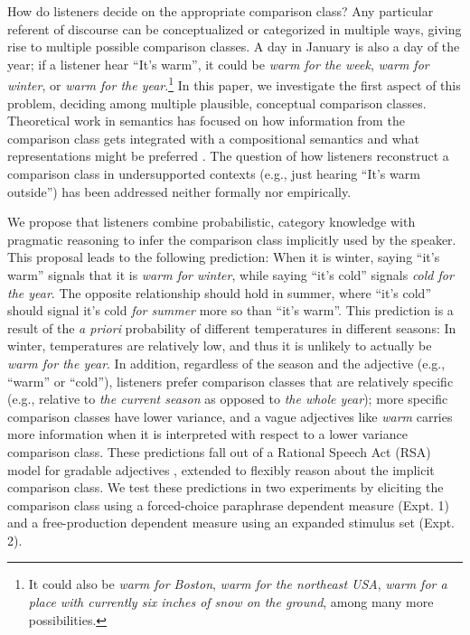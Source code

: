 \documentclass[doc]{apa6}
\begin{document}
How do listeners decide on the appropriate comparison class? Any
particular referent of discourse can be conceptualized or categorized in
multiple ways, giving rise to multiple possible comparison classes. A day in
January is also a day of the year; if a listener hear ``It's
warm'', it could be \emph{warm for the week}, \emph{warm for winter}, or
\emph{warm for the year}.\footnote{It could also be \emph{warm for
  Boston}, \emph{warm for the northeast USA}, \emph{warm for a place
  with currently six inches of snow on the ground}, among many more
  possibilities. } In this paper, we investigate the first aspect of
this problem, deciding among multiple plausible, conceptual comparison
classes. Theoretical work in semantics has focused on how information
from the comparison class gets integrated with a compositional semantics
and what representations might be preferred \cite{Bale2011, Solt2009}.
The question of how listeners reconstruct a comparison class in
undersupported contexts (e.g., just hearing ``It's warm outside'')
has been addressed neither formally nor empirically.

We propose that listeners combine probabilistic, category knowledge with
pragmatic reasoning to infer the comparison class implicitly used by the
speaker. This proposal leads to the following prediction: When it is
winter, saying ``it's warm'' signals that it is \emph{warm for
winter}, while saying ``it's cold'' signals \emph{cold for the
year}. The opposite relationship should hold in summer, where
``it's cold'' should signal it's cold \emph{for summer} more so
than ``it's warm''. This prediction is a result of the \emph{a
priori} probability of different temperatures in different seasons: In
winter, temperatures are relatively low, and thus it is unlikely to
actually be \emph{warm for the year}. In addition, regardless of the
season and the adjective (e.g., ``warm'' or ``cold''),
listeners prefer comparison classes that are relatively specific (e.g.,
relative to \emph{the current season} as opposed to \emph{the whole
year}); more specific comparison classes have lower variance, and a
vague adjectives like \emph{warm} carries more information when it is
interpreted with respect to a lower variance comparison class. These
predictions fall out of a Rational Speech Act (RSA) model for gradable
adjectives \cite{Lassiter2013, Lassiter2017}, extended to flexibly
reason about the implicit comparison class. We test these predictions in
two experiments by eliciting the comparison class using a forced-choice
paraphrase dependent measure (Expt. 1) and a free-production dependent
measure using an expanded stimulus set (Expt. 2).
\end{document}

